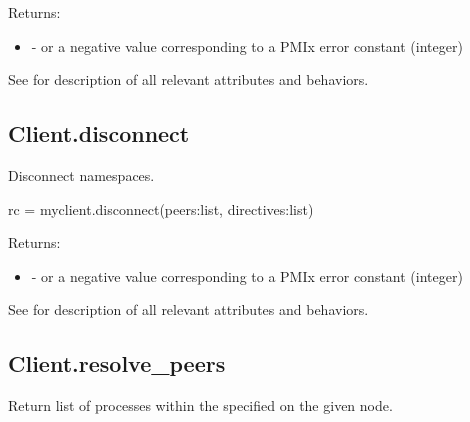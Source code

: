 Returns:

\begin{itemize}
    \item {} -  or a negative value corresponding to a PMIx error constant (integer)
\end{itemize}

See  for description of all relevant attributes and behaviors.


\subsection{Client.disconnect}

\summary

Disconnect namespaces.

\format

\pyspecificstart
\begin{codepar}
rc = myclient.disconnect(peers:list, directives:list)
\end{codepar}
\pyspecificend

\begin{arglist}
\end{arglist}

Returns:

\begin{itemize}
    \item {} -  or a negative value corresponding to a PMIx error constant (integer)
\end{itemize}

See  for description of all relevant attributes and behaviors.


\subsection{Client.resolve_peers}

\summary

Return list of processes within the specified  on the given node.

\format

